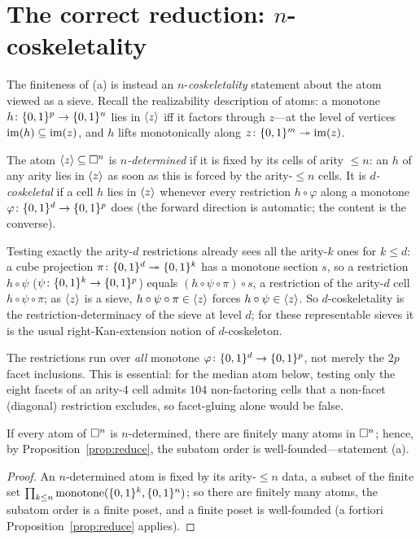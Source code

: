 \section{The correct reduction: \texorpdfstring{$n$}{n}-coskeletality}

The finiteness of \textup{(a)} is instead an $n$-\emph{coskeletality}
statement about the atom viewed as a sieve.  Recall the realizability
description of atoms: a monotone $h\colon\{0,1\}^p\to\{0,1\}^n$ lies in $\langle z \rangle$
iff it factors through $z$---at the level of vertices
$\operatorname{im}(h)\subseteq\operatorname{im}(z)$, and $h$ lifts monotonically along
$z\colon\{0,1\}^m\twoheadrightarrow\operatorname{im}(z)$.

\begin{defn}
  The atom $\langle z \rangle\subseteq\square^n$ is \emph{$n$-determined} if it is
  fixed by its cells of arity $\le n$: an $h$ of any arity lies in
  $\langle z \rangle$ as soon as this is forced by the arity-$\le n$ cells.  It is
  \emph{$d$-coskeletal} if a cell $h$ lies in $\langle z \rangle$ whenever every
  restriction $h\circ\varphi$ along a monotone $\varphi\colon\{0,1\}^d\to\{0,1\}^p$
  does (the forward direction is automatic; the content is the converse).
\end{defn}

\begin{rem}
  Testing exactly the arity-$d$ restrictions already sees all the
  arity-$k$ ones for $k\le d$: a cube projection
  $\pi\colon\{0,1\}^d\twoheadrightarrow\{0,1\}^k$ has a monotone section $s$, so a
  restriction $h\circ\psi$ ($\psi\colon\{0,1\}^k\to\{0,1\}^p$) equals
  $(h\circ\psi\circ\pi)\circ s$, a restriction of the arity-$d$ cell
  $h\circ\psi\circ\pi$; as $\langle z \rangle$ is a sieve, $h\circ\psi\circ\pi\in
  \langle z \rangle$ forces $h\circ\psi\in\langle z \rangle$.  So $d$-coskeletality is the
  restriction-determinacy of the sieve at level $d$; for these
  representable sieves it is the usual right-Kan-extension notion of
  $d$-coskeleton.
\end{rem}

\begin{rem}
  The restrictions run over \emph{all} monotone $\varphi\colon\{0,1\}^d\to\{0,1\}^p$,
  not merely the $2p$ facet inclusions.  This is essential: for the median
  atom below, testing only the eight facets of an arity-$4$ cell admits
  $104$ non-factoring cells that a non-facet (diagonal) restriction
  excludes, so facet-gluing alone would be false.
\end{rem}

\begin{prop}\label{prop:ndet}
  If every atom of $\square^n$ is $n$-determined, there are finitely many
  atoms in $\square^n$; hence, by Proposition~\ref{prop:reduce}, the
  subatom order is well-founded---statement \textup{(a)}.
\end{prop}
\begin{proof}
  An $n$-determined atom is fixed by its arity-$\le n$ data, a subset of
  the finite set $\prod_{k\le n}\mathrm{monotone}(\{0,1\}^k,\{0,1\}^n)$; so there
  are finitely many atoms, the subatom order is a finite poset, and a
  finite poset is well-founded (a fortiori Proposition~\ref{prop:reduce}
  applies).
\end{proof}

